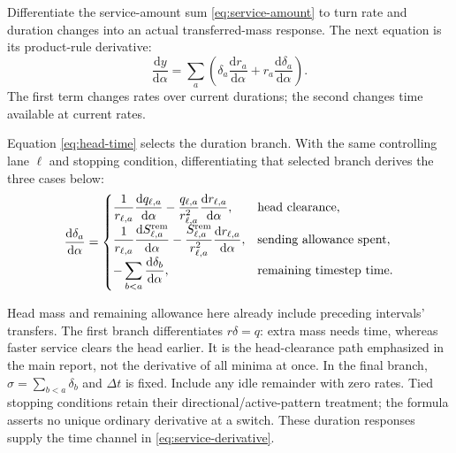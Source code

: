 \documentclass[10pt,a4paper]{article}
\begin{document}
Differentiate the service-amount sum \eqref{eq:service-amount} to turn
rate and duration changes into an actual transferred-mass response.
The next equation is its product-rule derivative:
\begin{equation}
 \frac{\mathrm dy}{\mathrm d\alpha}
 =\sum_a\left(\delta_a\frac{\mathrm dr_a}{\mathrm d\alpha}
              +r_a\frac{\mathrm d\delta_a}{\mathrm d\alpha}\right).
 \label{eq:service-derivative}
\end{equation}
The first term changes rates over current durations; the second changes
time available at current rates.
\par\begin{samepage}
Equation \eqref{eq:head-time} selects
the duration branch. With the same controlling lane $\ell$ and stopping
condition,
differentiating that selected branch derives the three cases below:
\begin{equation}
 \frac{\mathrm d\delta_a}{\mathrm d\alpha}
 =\begin{cases}
 \displaystyle\frac1{r_{\ell,a}}\frac{\mathrm dq_{\ell,a}}{\mathrm d\alpha}
 -\frac{q_{\ell,a}}{r_{\ell,a}^2}\frac{\mathrm dr_{\ell,a}}{\mathrm d\alpha},
 &\text{head clearance},\\[4pt]
 \displaystyle\frac1{r_{\ell,a}}\frac{\mathrm dS_{\ell,a}^{\rm rem}}{\mathrm d\alpha}
 -\frac{S_{\ell,a}^{\rm rem}}{r_{\ell,a}^2}\frac{\mathrm dr_{\ell,a}}{\mathrm d\alpha},
 &\text{sending allowance spent},\\[4pt]
 \displaystyle-\sum_{b<a}\frac{\mathrm d\delta_b}{\mathrm d\alpha},
 &\text{remaining timestep time}.
 \end{cases}
 \label{eq:duration-derivative}
\end{equation}
\par\end{samepage}
Head mass and remaining allowance here already include preceding
intervals' transfers. The first branch differentiates $r\delta=q$:
extra mass needs time, whereas faster service clears the head earlier.
It is the head-clearance path emphasized in the main report, not the
derivative of all minima at once. In the final branch,
$\sigma=\sum_{b<a}\delta_b$ and $\Delta t$ is fixed. Include any idle
remainder with zero rates. Tied stopping conditions retain their
directional/active-pattern treatment; the formula asserts no unique
ordinary derivative at a switch. These duration responses supply the
time channel in \eqref{eq:service-derivative}.
\end{document}
